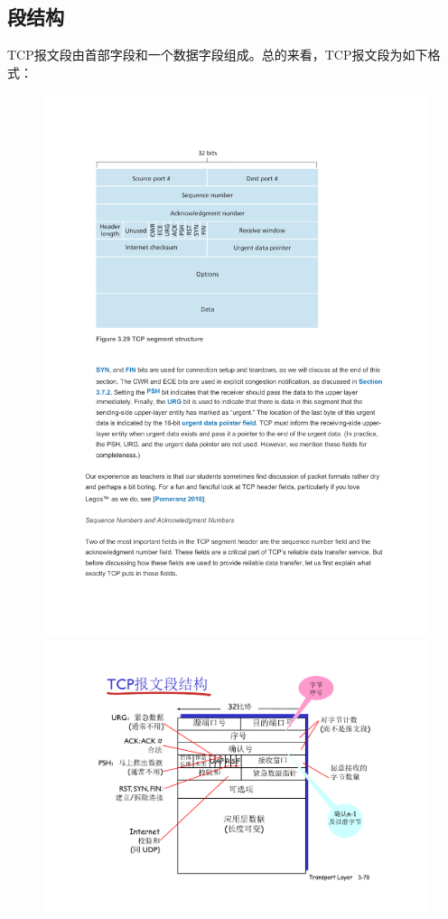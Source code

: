 \documentclass[]{report}
\begin{document}
		\subsection{段结构}
			TCP报文段由首部字段和一个数据字段组成。总的来看，TCP报文段为如下格式：\par
			\begin{figure}[h!]
				\centering
				\begin{minipage}{20em}
					\centering
					\includegraphics[scale = 0.5]{images/TCP_Segment_Structure.pdf}
				\end{minipage}
				\begin{minipage}{20em}
					\centering
					\includegraphics[scale = 0.3]{images/TCP_Segment_2nd.pdf}

\end{minipage}
\end{figure}
\end{document}
